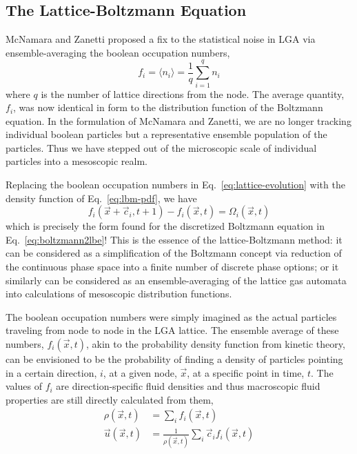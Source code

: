 \subsection{The Lattice-Boltzmann Equation}\label{sec:lbm-equations}

McNamara and Zanetti proposed a fix to the statistical noise in LGA via ensemble-averaging the boolean occupation numbers,\cite{McNamara1988}
\begin{equation}\label{eq:lbm-pdf}
	f_i = \langle n_i \rangle = \frac{1}{q}\sum_{i=1}^qn_i
\end{equation}
where $q$ is the number of lattice directions from the node. The average quantity, $f_i$, was now identical in form to the distribution function of the Boltzmann equation. In the formulation of McNamara and Zanetti, we are no longer tracking individual boolean particles but a representative ensemble population of the particles. Thus we have stepped out of the microscopic scale of individual particles into a mesoscopic realm. 

Replacing the boolean occupation numbers in Eq.~\ref{eq:lattice-evolution} with the density function of Eq.~\ref{eq:lbm-pdf}, we have
\begin{equation}\label{eq:lbm-evolution}
	f_i(\vec{x}+\vec{c}_i, t + 1) - f_i(\vec{x},t) = \Omega_i(\vec{x},t)
\end{equation}
which is precisely the form found for the discretized Boltzmann equation in Eq.~\ref{eq:boltzmann2lbe}! This is the essence of the lattice-Boltzmann method: it can be considered as a simplification of the Boltzmann concept via reduction of the continuous phase space into a finite number of discrete phase options; or it similarly can be considered as an ensemble-averaging of the lattice gas automata into calculations of mesoscopic distribution functions.

The boolean occupation numbers were simply imagined as the actual particles traveling from node to node in the LGA lattice. The ensemble average of these numbers, $f_i(\vec{x},t)$, akin to the probability density function from kinetic theory, can be envisioned to be the probability of finding a density of particles pointing in a certain direction, $i$, at a given node, $\vec{x}$, at a specific point in time, $t$. The values of $f_i$ are direction-specific fluid densities and thus macroscopic fluid properties are still directly calculated from them,
\begin{subequations}\label{eq:lbm2physical}
\begin{align}
	\rho(\vec{x},t) &= \sum_i f_i(\vec{x},t)\\
	\vec{u}(\vec{x},t) &= \frac{1}{\rho(\vec{x},t)}\sum_i \vec{c}_if_i(\vec{x},t)
\end{align}
\end{subequations}

